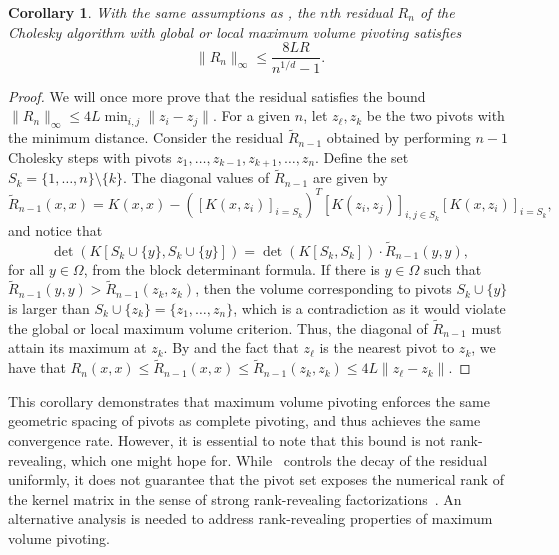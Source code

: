 \documentclass{amsart}
\newtheorem{corollary}{Corollary}[section]
\theoremstyle{definition}
\theoremstyle{remark}
\begin{document}
\begin{corollary}
    With the same assumptions as , the $n$th residual $R_n$ of the Cholesky algorithm with global or local maximum volume pivoting satisfies
    \begin{equation*}
        \|R_n\|_\infty \leq \frac{8LR}{n^{1/d}-1}.
    \end{equation*}
    \label{cor:maxvol}
\end{corollary}
\begin{proof}
    We will once more prove that the residual satisfies the bound $\|R_n\|_\infty \leq 4L \min_{i, j}\|z_i - z_j\|$. For a given $n$, let $z_{\ell}, z_k$ be the two pivots with the minimum distance. Consider the residual $\tilde{R}_{n-1}$ obtained by performing $n-1$ Cholesky steps with pivots $z_1, \dots, z_{k-1},z_{k+1},\ldots, z_n$. Define the set $S_k = \{1, \dots, n\}\setminus\{k\}$. The diagonal values of $\tilde{R}_{n-1}$ are given by    \begin{equation*}
        \tilde{R}_{n-1}(x, x) = K(x, x) - \left([K(x, z_i)]_{i=S_k}\right)^T [K(z_i, z_j)]_{i, j\in S_k} [K(x, z_i)]_{i=S_k},
    \end{equation*}
    and notice that 
    \begin{equation*}
        \det\left(K[S_k \cup \{y\}, S_k \cup \{y\}]\right) = \det\left(K[S_k,S_k]\right) \cdot \tilde{R}_{n-1}(y, y),
    \end{equation*}
    for all $y\in \Omega$, from the block determinant formula. If there is $y\in\Omega$ such that $\tilde{R}_{n-1}(y, y)>\tilde{R}_{n-1}(z_k, z_k)$, then the volume corresponding to pivots $S_k \cup \{y\}$ is larger than $S_k\cup\{z_k\} = \{z_1, \dots, z_n\}$, which is a contradiction as it would violate the global or local maximum volume criterion. Thus, the diagonal of $\tilde{R}_{n-1}$ must attain its maximum at $z_k$. By  and the fact that $z_{\ell}$ is the nearest pivot to $z_k$, we have that $R_n(x, x) \leq \tilde{R}_{n-1}(x, x) \leq \tilde{R}_{n-1}(z_k, z_k)\leq 4L \|z_\ell - z_k\|$. 
\end{proof}
This corollary demonstrates that maximum volume pivoting enforces the same geometric spacing of pivots as complete pivoting, and thus achieves the same convergence rate. 
However, it is essential to note that this bound is not rank-revealing, which one might hope for. While~ controls the decay of the residual uniformly, it does not guarantee that the pivot set exposes the numerical rank of the kernel matrix in the sense of strong rank-revealing factorizations~\cite{damle2024reveal}. An alternative analysis is needed to address rank-revealing properties of maximum volume pivoting.
\end{document}
